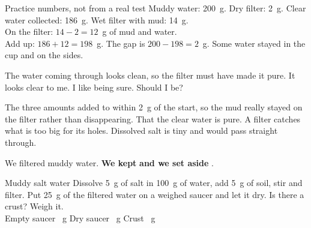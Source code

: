 \begin{worked}{Practice numbers, not from a real test}
Muddy water: 200~g. Dry filter: 2~g. Clear water collected: 186~g. Wet filter with mud: 14~g.\\
On the filter: $14-2=12$~g of mud and water.\\
Add up: $186+12=198$~g. The gap is $200-198=2$~g. Some water stayed in the cup and on the sides.
\end{worked}

\begin{center}
\end{center}

\begin{multix}[hmm]\multixbot[hmm]\tcblower
The water coming through looks clean, so the filter must have made it pure. It looks clear to me. I like being sure. Should I be?
\end{multix}

{The three amounts added to within 2~g of the start, so the mud really stayed on the filter rather than disappearing.}
{That the clear water is pure. A filter catches what is too big for its holes. Dissolved salt is tiny and would pass straight through.}

\begin{keepbox}
We filtered muddy water. \textbf{We kept} \wline[3.4cm] \textbf{and we set aside} \wline[3.4cm].
\end{keepbox}

\clearpage

\begin{tryit}{Muddy salt water}
Dissolve 5~g of salt in 100~g of water, add 5~g of soil, stir and filter. Put 25~g of the filtered water on a weighed saucer and let it dry. Is there a crust? Weigh it.\\[4pt]
Empty saucer \wline[2cm]~g \quad Dry saucer \wline[2cm]~g \quad Crust \wline[2cm]~g
\end{tryit}

